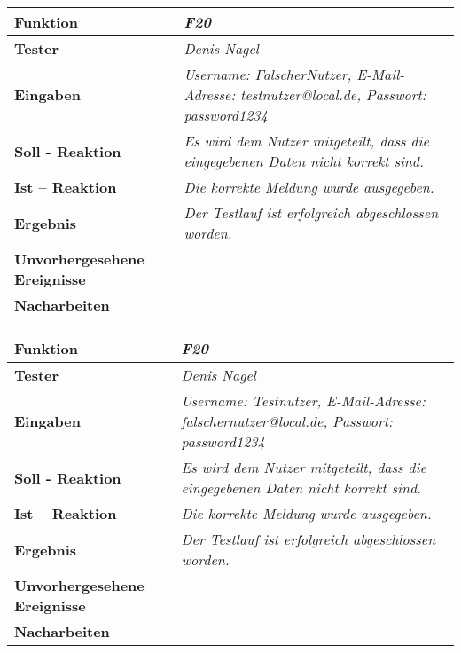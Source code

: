 \newpage
\begin{longtable}{|p{4cm}|p{11cm}|}
\hline
\textbf{Funktion} & \textit{\textbf{F20}} \\
\hline
\textbf{Tester} & \textit{Denis Nagel} \\
\hline
\textbf{Eingaben} & \textit{Username: FalscherNutzer, E-Mail-Adresse: testnutzer@local.de, Passwort: password1234} \\
\hline
\textbf{Soll - Reaktion} & \textit{Es wird dem Nutzer mitgeteilt, dass die eingegebenen Daten nicht korrekt sind.} \\
\hline
\textbf{Ist -- Reaktion} & \textit{Die korrekte Meldung wurde ausgegeben.} \\
\hline
\textbf{Ergebnis} & \textit{Der Testlauf ist erfolgreich abgeschlossen worden.} \\
\hline
\textbf{Unvorhergesehene Ereignisse} &
\textit{} \\
\hline
\textbf{Nacharbeiten } & \textit{} \\
\hline
\end{longtable}

\newpage
\begin{longtable}{|p{4cm}|p{11cm}|}
\hline
\textbf{Funktion} & \textit{\textbf{F20}} \\
\hline
\textbf{Tester} & \textit{Denis Nagel} \\
\hline
\textbf{Eingaben} & \textit{Username: Testnutzer, E-Mail-Adresse: falschernutzer@local.de, Passwort: password1234} \\
\hline
\textbf{Soll - Reaktion} & \textit{Es wird dem Nutzer mitgeteilt, dass die eingegebenen Daten nicht korrekt sind.} \\
\hline
\textbf{Ist -- Reaktion} & \textit{Die korrekte Meldung wurde ausgegeben.} \\
\hline
\textbf{Ergebnis} & \textit{Der Testlauf ist erfolgreich abgeschlossen worden.} \\
\hline
\textbf{Unvorhergesehene Ereignisse} &
\textit{} \\
\hline
\textbf{Nacharbeiten } & \textit{} \\
\hline
\end{longtable}

